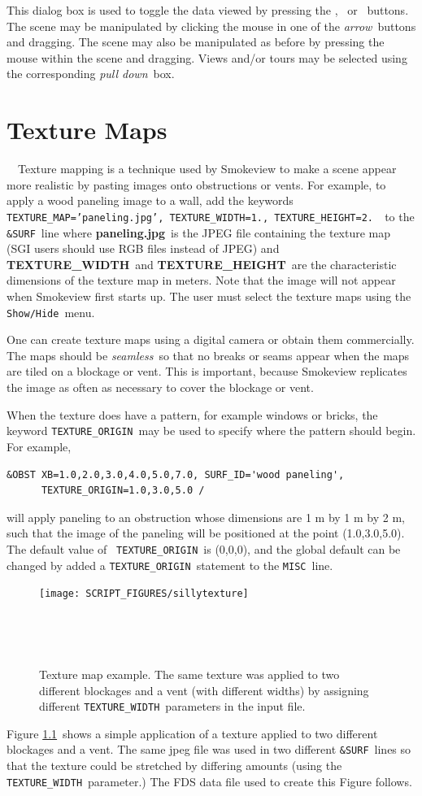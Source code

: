 \documentclass[11pt,twoside]{book}
\newcommand{\frameit}[1]{\fbox{\tt #1}}
\begin{document}
This dialog box is used to toggle the data viewed by pressing the
\frameit{Smoke/Fire}, \frameit{Temperature}\ or \frameit{Oxygen}\
buttons. The scene may be manipulated by clicking the mouse in one
of the {\em arrow}\ buttons and dragging.  The scene may also be
manipulated as before by pressing the mouse within the scene and
dragging. Views and/or tours may be selected using the
corresponding {\em pull down}\ box.

\chapter{Texture Maps}\ \label{chapter:texturemaps}\ Texture mapping is a technique used by
Smokeview to make a scene appear more realistic by pasting images
onto obstructions or vents. For example, to apply a wood paneling
image to a wall, add the keywords {\tt
TEXTURE\_MAP='paneling.jpg', TEXTURE\_WIDTH=1., TEXTURE\_HEIGHT=2.
}\ to the {\tt \&SURF}\ line where {\bf paneling.jpg}\ is the JPEG
file containing the texture map (SGI users should use RGB files
instead of JPEG) and {\bf TEXTURE\_WIDTH}\ and {\bf
TEXTURE\_HEIGHT}\ are the characteristic dimensions of the texture
map in meters. Note that the image will not appear when Smokeview
first starts up. The user must select the texture maps using the
{\tt Show/Hide}\ menu.

One can create texture maps using a digital camera or obtain them
commercially.  The maps should be {\em seamless}\ so that no
breaks or seams appear when the maps are tiled on a blockage or
vent.  This is important, because Smokeview replicates the image
as often as necessary to cover the blockage or vent.

When the texture does have a pattern, for example windows or
bricks, the keyword {\tt TEXTURE\_ORIGIN}\ may be used to specify
where the pattern should begin.  For example,
\begin{lstlisting}
&OBST XB=1.0,2.0,3.0,4.0,5.0,7.0, SURF_ID='wood paneling',
      TEXTURE_ORIGIN=1.0,3.0,5.0 /
\end{lstlisting}
\noindent will apply paneling to an obstruction whose dimensions
are 1 m by 1 m by 2 m, such that the image of the paneling will be
positioned at the point (1.0,3.0,5.0). The default value of {\tt
TEXTURE\_ORIGIN}\ is (0,0,0), and the global default can be changed
by added a {\tt TEXTURE\_ORIGIN}\ statement to the {\tt MISC}\ line.

\begin{figure}[bph]
\centerline{\texttt{[image: SCRIPT\_FIGURES/sillytexture]}
}\ \caption [Texture map example.] {
Texture map example.  The same texture was applied to two different
blockages and a vent (with different widths) by assigning different {\tt TEXTURE\_WIDTH}\
parameters in the input file.
}\ \label{figTextures}
\end{figure}
Figure \ref{figTextures}\ shows a simple application of a texture
applied to two different blockages and a vent.  The same jpeg file
was used in two different {\tt \&SURF}\ lines so that the texture
could be stretched by differing amounts (using the {\tt
TEXTURE\_WIDTH}\ parameter.)  The FDS data file used to create
this Figure follows.
\end{document}
